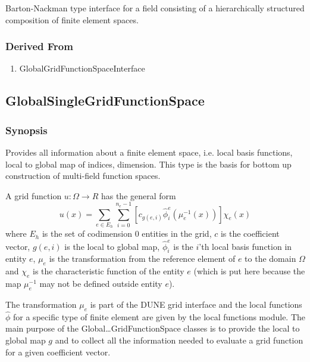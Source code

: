 \documentclass[11pt,a4paper,DIV11,%
notitlepage,oneside,abstracton,%
bibtotoc]{scrartcl}
\begin{document}
Barton-Nackman type interface for a field consisting of 
a hierarchically structured composition of finite element spaces.

\subsubsection{Derived From}

\begin{enumerate}[1)]
\item GlobalGridFunctionSpaceInterface
\end{enumerate}

\subsection{GlobalSingleGridFunctionSpace}

\subsubsection{Synopsis}

Provides all information about a finite element space, i.e. local
basis functions, local to global map of indices, dimension.
This type is the basis for bottom up construction of multi-field
function spaces.

A grid function $u: \Omega \to R$ has the general form
\begin{equation}
u(x) = \sum_{e\in E_h} \sum_{i=0}^{n_e-1} \left[ c_{g(e,i)} \hat\phi_i^e(\mu_e^{-1}(x)) 
  \right]\chi_e(x)
\end{equation}
where $E_h$ is the set of codimension 0 entities in the grid, $c$ is
the coefficient vector, $g(e,i)$ is the local to global map,
$\hat\phi_i^e$ is the $i$'th local basis function in entity $e$,
$\mu_e$ is the transformation from the reference element of $e$ to
the domain $\Omega$ and $\chi_e$ is the characteristic function of the
entity $e$ (which is put here because the map $\mu_e^{-1}$ may not be
defined outside entity $e$).

The transformation $\mu_e$ is part of the DUNE grid interface and the
local functions $\hat\phi$ for a specific type of finite element are
given by the local functions module. The main purpose of the
Global{\ldots}GridFunctionSpace classes is to provide the local to
global map $g$ and to collect all the information needed to evaluate a
grid function for a given coefficient vector.  
\end{document}
